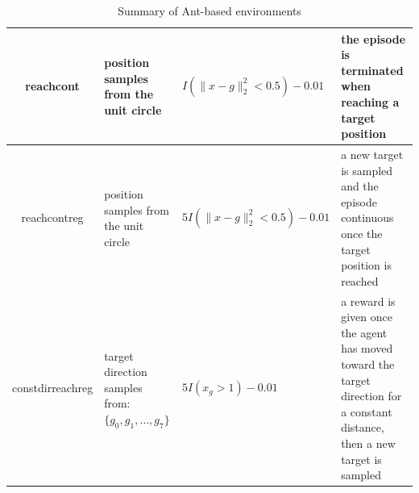 \begin{table}[!htbp]
\begin{center}
\begin{tabular}{|c|p{3cm}|p{4cm}|p{4cm}|}
reachcont & position samples from the unit circle & $I(\lVert x-g\rVert_2^2<0.5) - 0.01$  & the episode is terminated when reaching a target position\\ \hline
reachcontreg & position samples from the unit circle & $5I(\lVert x-g\rVert_2^2<0.5) - 0.01$  & a new target is sampled and the episode continuous once the target position is reached\\ \hline
constdirreachreg & target direction samples from: $\{g_0,g_1, \dots,g_7\}$ & $5I(x_g > 1) - 0.01$  & a reward is given once the agent has moved toward the target direction for a constant distance, then a new target is sampled\\ \hline
\end{tabular}
\end{center}
 \caption{Summary of Ant-based environments}
\end{table}\label{table_ant_envs}
